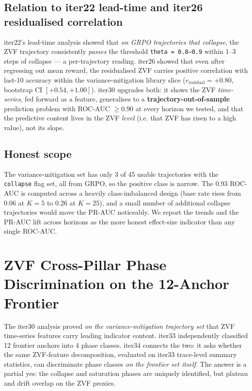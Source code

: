\documentclass{article}
\begin{document}
\subsection{Relation to iter22 lead-time and iter26 residualised correlation}
\label{sec:zvf-iter30-relation}

iter22's lead-time analysis showed that \emph{on GRPO trajectories
that collapse}, the ZVF trajectory consistently \emph{passes} the
threshold \texttt{theta = 0.8–0.9} within 1–3 steps of collapse
--- a per-trajectory reading. iter26 showed that even after
regressing out mean reward, the residualised ZVF carries positive
correlation with last-10 accuracy within the variance-mitigation
library slice ($r_{\text{residual}}{=}+0.80$, bootstrap CI
$[+0.54, +1.00]$). iter30 upgrades both: it shows the ZVF
\emph{time-series}, fed forward as a feature, generalises to a
\textbf{trajectory-out-of-sample} prediction problem with
ROC-AUC $\ge 0.90$ at every horizon we tested, and that the
predictive content lives in the ZVF \emph{level} (i.e. that ZVF has
risen to a high value), not its slope.

\subsection{Honest scope}
\label{sec:zvf-iter30-honest}

The variance-mitigation set has only 3 of 45 usable trajectories
with the \texttt{collapse} flag set, all from GRPO, so the positive
class is narrow. The 0.93 ROC-AUC is computed across a heavily
class-imbalanced design (base rate rises from 0.06 at $K{=}5$ to
0.26 at $K{=}25$), and a small number of additional collapse
trajectories would move the PR-AUC noticeably. We report the
trends and the PR-AUC lift across horizons as the more honest
effect-size indicator than any single ROC-AUC.
 

\section{ZVF Cross-Pillar Phase Discrimination on the 12-Anchor Frontier}
\label{sec:zvf-iter34}

The iter30 analysis proved \emph{on the variance-mitigation
trajectory set} that ZVF time-series features carry leading
indicator content. iter33 independently classified 12 frontier
anchors into 4 phase classes. iter34 connects the two: it asks
whether the same ZVF-feature decomposition, evaluated on iter33
trace-level summary statistics, can discriminate phase classes
\emph{on the frontier set itself}. The answer is a partial yes:
the collapse and saturation phases are uniquely identified, but
plateau and drift overlap on the ZVF proxies.
\end{document}
